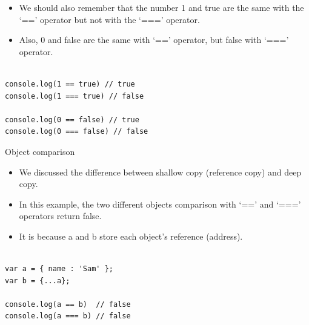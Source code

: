 \begin{frame}[fragile]{}

\begin{itemize}
	\item We should also remember that the number 1 and true are the same with the `==' operator but not with the `===' operator. 
	\item Also, 0 and false are the same with `==' operator, but false with `===' operator.
\end{itemize}

\begin{Code}{}%
\begin{lstlisting}[firstnumber=1, label=glabels, xleftmargin=0pt, basicstyle=\scriptsize]% 

console.log(1 == true) // true
console.log(1 === true) // false

console.log(0 == false) // true
console.log(0 === false) // false
\end{lstlisting}%
\end{Code}%

\end{frame}

\begin{frame}[fragile]{Object comparison}

\begin{itemize}
	\item We discussed the difference between shallow copy (reference copy) and deep copy. 
	\item In this example, the two different objects comparison with `==' and `===' operators return false. 
	\item It is because a and b store each object's reference (address). 
\end{itemize}

\begin{Code}{}%
\begin{lstlisting}[firstnumber=1, label=glabels, xleftmargin=0pt, basicstyle=\scriptsize]% 

var a = { name : 'Sam' };
var b = {...a};

console.log(a == b)  // false
console.log(a === b) // false
\end{lstlisting}%
\end{Code}%

\end{frame}


